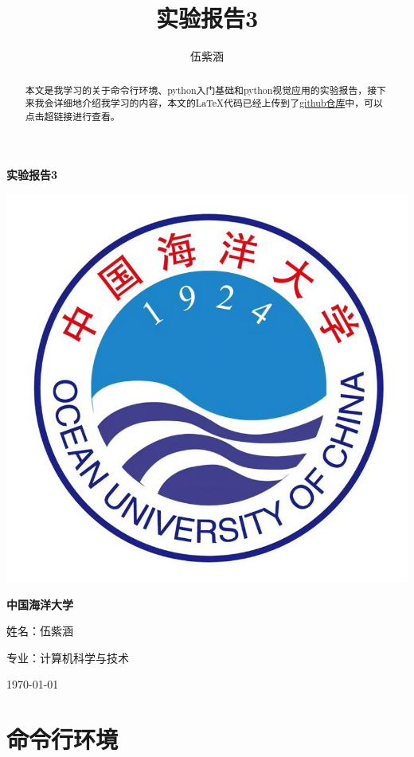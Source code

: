 \documentclass{article}
\title{实验报告3}
\author{伍紫涵}
\begin{document}
\begin{titlepage}
    \centering
    {\Huge\bfseries 实验报告3 \par}
    \vspace{2cm}
    \includegraphics[width=0.7\linewidth]{ouc.png} \par
    \vspace{0.6cm}
    {\bfseries\color{oucblue} 中国海洋大学}\par
    \vspace{0.5cm}
    {\LARGE 姓名：伍紫涵 \par}
    \vspace{0.4cm}
    {\LARGE 专业：计算机科学与技术 \par}
    \vspace{0.4cm}
    {\large \today \par}
\end{titlepage}

\thispagestyle{plain}
\begin{abstract}
{\large
本文是我学习的关于命令行环境、python入门基础和python视觉应用的实验报告，接下来我会详细地介绍我学习的内容，本文的LaTeX代码已经上传到了\href{https://github.com/qiqiqisi/Latex_Used.git}{github仓库}中，可以点击超链接进行查看。
}
\end{abstract}

\setcounter{page}{1}
{
\hypersetup{hidelinks}
\tableofcontents
}


\newpage
{}
\setcounter{page}{1}


\section{命令行环境}
\end{document}

